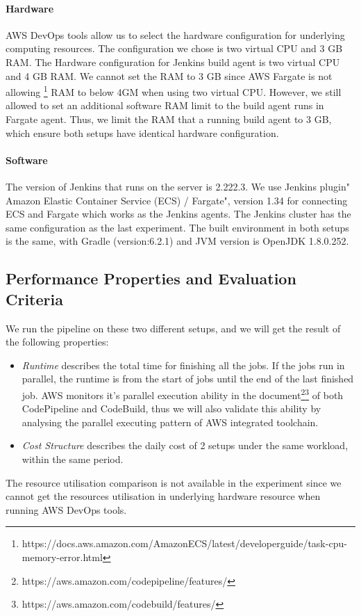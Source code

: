 \paragraph{Hardware}
AWS DevOps tools allow us to select the hardware configuration for underlying computing resources. The configuration we chose is two virtual CPU and 3 GB RAM.
The Hardware configuration for Jenkins build agent is two virtual CPU and 4 GB RAM. We cannot set the RAM to 3 GB since AWS Fargate is not allowing \footnote{https://docs.aws.amazon.com/AmazonECS/latest/developerguide/task-cpu-memory-error.html} RAM to below 4GM when using two virtual CPU. However, we still allowed to set an additional software RAM limit to the build agent runs in Fargate agent. Thus, we limit the RAM that a running build agent to 3 GB, which ensure both setups have identical hardware configuration.
\paragraph{Software}
The version of Jenkins that runs on the server is 2.222.3. We use Jenkins plugin" Amazon Elastic Container Service (ECS) / Fargate", version 1.34 for connecting ECS and Fargate which works as the Jenkins agents. The Jenkins cluster has the same configuration as the last experiment. The built environment in both setups is the same, with Gradle (version:6.2.1) and JVM version is OpenJDK 1.8.0.252.
\subsection{Performance Properties and Evaluation Criteria}
We run the pipeline on these two different setups, and we will get the result of the following properties:
\begin{itemize}
\item \textit{Runtime} describes the total time for finishing all the jobs. If the jobs run in parallel, the runtime is from the start of jobs until the end of the last finished job. AWS monitors it's parallel execution ability in the document\footnote{https://aws.amazon.com/codepipeline/features/}\footnote{https://aws.amazon.com/codebuild/features/} of both CodePipeline and CodeBuild, thus we will also validate this ability by analysing the parallel executing pattern of AWS integrated toolchain. \label{aws_parallel}
\item \textit{Cost Structure} describes the daily cost of 2 setups under the same workload, within the same period.
\end{itemize}
The resource utilisation comparison is not available in the experiment since we cannot get the resources utilisation in underlying hardware resource when running AWS DevOps tools.
